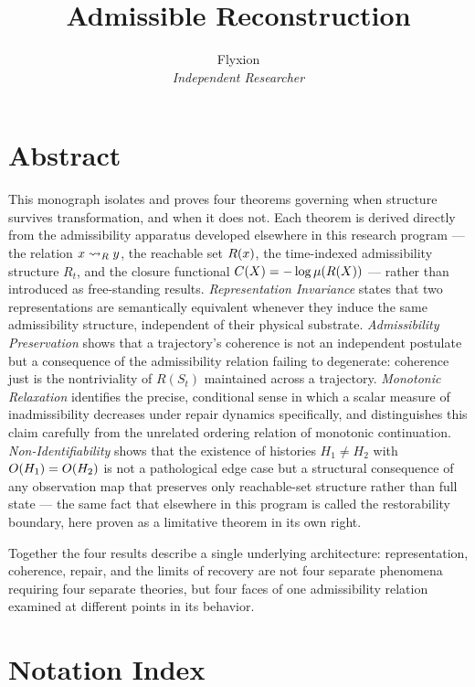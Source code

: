 \documentclass[11pt]{book}
\title{\textbf{Admissible Reconstruction}}
\author{Flyxion \\ \textit{Independent Researcher}}
\date{}
\begin{document}
\frontmatter

\maketitle

\chapter*{Abstract}

This monograph isolates and proves four theorems governing when structure
survives transformation, and when it does not. Each theorem is derived
directly from the admissibility apparatus developed elsewhere in this
research program --- the relation $x \rightsquigarrow_{R} y$, the reachable set
$R(x)$, the time-indexed admissibility structure $R_t$, and the
closure functional $C(X) = -\log \mu(R(X))$ --- rather than
introduced as free-standing results. \emph{Representation Invariance}
states that two representations are semantically equivalent whenever
they induce the same admissibility structure, independent of their
physical substrate. \emph{Admissibility Preservation} shows that a
trajectory's coherence is not an independent postulate but a consequence
of the admissibility relation failing to degenerate: coherence just is
the nontriviality of $R(S_t)$ maintained across a trajectory.
\emph{Monotonic Relaxation} identifies the precise, conditional sense in
which a scalar measure of inadmissibility decreases under repair
dynamics specifically, and distinguishes this claim carefully from the
unrelated ordering relation of monotonic continuation. \emph{Non-Identifiability}
shows that the existence of histories $H_1 \neq H_2$ with
$O(H_1) = O(H_2)$ is not a pathological edge case but a
structural consequence of any observation map that preserves only
reachable-set structure rather than full state --- the same fact that
elsewhere in this program is called the restorability boundary, here
proven as a limitative theorem in its own right.

Together the four results describe a single underlying architecture:
representation, coherence, repair, and the limits of recovery are not
four separate phenomena requiring four separate theories, but four
faces of one admissibility relation examined at different points in its
behavior.

\tableofcontents

\chapter*{Notation Index}
\end{document}
